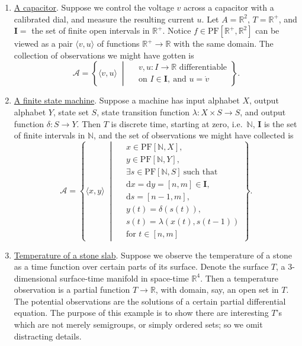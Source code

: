 \documentclass[10pt,a4paper,twocolumn]{article}
\newcommand{\A}{\mathcal{A}}          %
\newcommand{\Iset}{\mathbf{I}}          %
\newcommand{\R}{\mathbb{R}}
\newcommand{\Rpos}{\R^{+}}
\newcommand{\PF}{\mathrm{PF}}
\newcommand{\dom}{\mathrm{d}}            %
\newcommand{\origpage}[1]{%
  \marginpar{\raggedright\footnotesize\itshape p.~#1}%
}
\begin{document}
\begin{enumerate}
	\item \underline{A capacitor}.
	Suppose we control the voltage $v$ across a capacitor with a calibrated dial, and measure the resulting current $u$.
	Let $A=\R^{2}$, $T=\Rpos$, and $\Iset =$ the set of finite open intervals in $\Rpos$.
	Notice $f\in\PF[\Rpos,\R^{2}]$ can be viewed as a pair $\langle v,u\rangle$ of functions $\Rpos\to\R$ with the same domain.
	The collection of observations we might have gotten is
	\begin{equation*}
    \A = \left\{ \langle v,u\rangle \;\middle|\;
      \begin{aligned}
        & v,u\colon I\to\R \text{ differentiable}\\
        & \text{on } I\in\Iset,\ \text{and } u = \dot v
      \end{aligned}
    \right\}.
  \end{equation*}

	\item \underline{A finite state machine}.
	Suppose a machine has input alphabet $X$, output alphabet $Y$, state set $S$, state transition function $\lambda\colon X\times S\to S$, and output function $\delta\colon S\to Y$.
	Then $T$ is discrete time, starting at zero, i.e.\ $\mathbb{N}$, $\Iset$
	is the set of finite intervals in $\mathbb{N}$, and the set of
	observations\origpage{123} we might have collected is
	\begin{equation*}
    \A = \left\{
      \langle x,y\rangle
      \;\middle|\;
      \begin{aligned}
      & x\in\PF[\mathbb{N},X],\\
      & y\in\PF[\mathbb{N},Y],\\
      & \exists s\in\PF[\mathbb{N},S]\ \text{such that}\\
      & \dom x = \dom y = [n,m]\in\Iset,\\
      & \dom s = [n-1,m],\\
      & y(t) = \delta(s(t)),\\
      & s(t) = \lambda(x(t), s(t-1))\\
      & \text{for } t\in[n,m]
      \end{aligned}
    \right\}.
  \end{equation*}

	\item \underline{Temperature of a stone slab}.
	Suppose we observe the temperature of a stone as a time function over certain parts of its
	surface.
	Denote the surface $T$, a $3$-dimensional surface-time manifold in space-time $\R^{4}$.
  Then a temperature observation is a partial function $T\to\R$, with domain, say, an open set in $T$.
	The potential observations are the solutions of a certain partial differential equation.
  The purpose of this example is to show there are interesting $T$'s which are not merely semigroups, or simply ordered sets; so we omit distracting details.
\end{enumerate}
\end{document}
